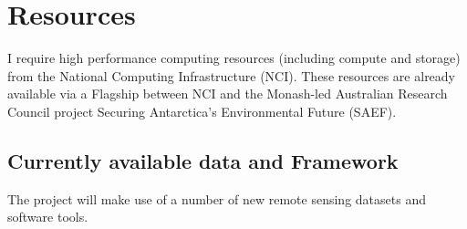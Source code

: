 \chapter{Resources}\label{resources}
I require high performance computing resources (including compute and storage) from the National Computing Infrastructure (NCI). These resources are already available via a Flagship between NCI and the Monash-led Australian Research Council project Securing Antarctica’s Environmental Future (SAEF).

\section*{Currently available data and Framework}\label{data}
The project will make use of a number of new remote sensing datasets and software tools.

